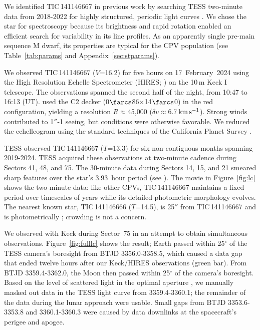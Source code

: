 \documentclass[11pt,twocolumn,tighten,linenumbers]{aastex7}
\newcommand{\kms}{\ensuremath{\rm km\,s^{-1}}}
\begin{document}
We identified TIC\,141146667 in previous work \citep{Bouma2024} by
searching TESS two-minute data from 2018-2022 for highly structured,
periodic light curves \citep{Ricker2015}.  We chose the star for
spectroscopy because its brightness and rapid rotation enabled an
efficient search for variability in its line profiles.  As an
apparently single pre-main sequence M dwarf, its properties are
typical for the CPV population (see Table~\ref{tab:params} and
Appendix~\ref{sec:stparams}).

We observed TIC\,141146667 ($V$=16.2) for five hours on
17~February~2024 using the High Resolution Echelle Spectrometer
(HIRES; \citealt{vogt_hires_1994}) on the 10\,m Keck I telescope.  The
observations spanned the second half of the night, from 10:47 to 16:13
(UT).   used the C2
decker (0$\farcs$86$\times$14$\farcs$0) in the red configuration,
yielding a resolution $R$$\approx$45{,}000 ($\delta
v$$\approx$6.7\,\kms).  Strong winds contributed to 1$''$-1
seeing, but conditions were otherwise favorable.  We reduced the
echelleogram using the standard techniques of the California Planet
Survey \citep{Howard2010}.  

TESS observed TIC\,141146667 ($T$=13.3) for six non-contiguous months
spanning 2019-2024.  TESS acquired these observations at two-minute
cadence during Sectors 41, 48, and 75.   The 30-minute data during
Sectors 14, 15, and 21 smeared sharp features over the star's
3.93~hour period (see \citealt{Gunther2022}).  The movie in
Figure~\ref{fig:lc} shows the two-minute data: like other CPVs,
TIC\,141146667 maintains a fixed period over timescales of years while
its detailed photometric morphology evolves.  The nearest known star,
TIC\,141146666 ($T$=14.5), is 25$''$ from TIC\,141146667 and is
photometrically ; crowding is not a concern.

We observed with Keck during Sector~75 in an attempt to obtain
simultaneous observations.   Figure~\ref{fig:fulllc} shows the result;
Earth passed within 25$^\circ$ of the TESS camera's boresight from
BTJD 3356.0-3358.5, which caused a data gap that ended twelve hours
after our Keck/HIRES observations (green bar).  From BTJD
3359.4-3362.0, the Moon then passed within 25$^\circ$ of the camera's
boresight.  Based on the level of scattered light in the optimal
aperture \citep{Jenkins2016}, we manually masked out data in the TESS
light curve from 3359.4-3360.1; the remainder of the data during the
lunar approach were usable.  Small gaps from BTJD 3353.6-3353.8 and
3360.1-3360.3 were caused by data downlinks at the spacecraft's
perigee and apogee.
\end{document}
